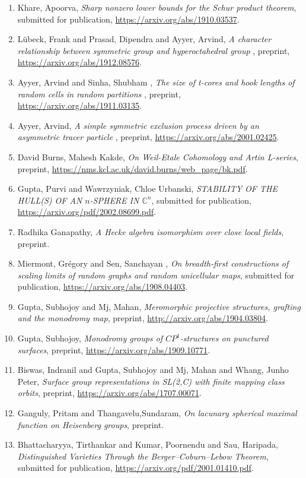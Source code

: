 \begin{enumerate}
\item Khare, Apoorva, \emph{Sharp nonzero lower bounds for the Schur product theorem}, submitted for publication, \url{https://arxiv.org/abs/1910.03537}.
\item Lübeck, Frank and Prasad, Dipendra and Ayyer, Arvind, \emph{A character relationship between symmetric group and hyperoctahedral group }, preprint, \url{https://arxiv.org/abs/1912.08576}.
\item Ayyer, Arvind and Sinha, Shubham , \emph{The size of t-cores and hook lengths of random cells in random partitions }, preprint, \url{https://arxiv.org/abs/1911.03135}.
\item Ayyer, Arvind, \emph{ A simple symmetric exclusion process driven by an asymmetric tracer particle }, preprint, \url{https://arxiv.org/abs/2001.02425}.
\item David Burns, Mahesh Kakde, \emph{On Weil-Etale Cohomology and Artin L-series}, preprint, \url{https://nms.kcl.ac.uk/david.burns/web_page/bk.pdf}.
\item Gupta, Purvi and Wawrzyniak, Chloe Urbanski, \emph{STABILITY OF THE HULL(S) OF AN $n$-SPHERE IN $\mathbb{C}^n$}, submitted for publication, \url{https://arxiv.org/pdf/2002.08699.pdf}.
\item Radhika Ganapathy, \emph{A Hecke algebra isomorphism over close local fields}, preprint.
\item Miermont, Grégory and Sen, Sanchayan , \emph{On breadth-first constructions of scaling limits of random graphs and random unicellular maps}, submitted for publication, \url{https://arxiv.org/abs/1908.04403}.
\item Gupta, Subhojoy and Mj, Mahan, \emph{Meromorphic projective structures, grafting and the monodromy map}, preprint, \url{http://arxiv.org/abs/1904.03804}.
\item Gupta, Subhojoy, \emph{Monodromy groups of $CP^1$-structures on punctured surfaces}, preprint, \url{https://arxiv.org/abs/1909.10771}.
\item Biswas, Indranil and Gupta, Subhojoy and Mj, Mahan and Whang, Junho Peter, \emph{Surface group representations in SL(2,C) with finite mapping class orbits}, preprint, \url{https://arxiv.org/abs/1707.00071}.
\item Ganguly, Pritam and Thangavelu,Sundaram, \emph{On lacunary spherical maximal function on Heisenberg groups}, preprint.
\item Bhattacharyya, Tirthankar and Kumar, Poornendu and Sau, Haripada, \emph{Distinguished Varieties Through the Berger--Coburn--Lebow Theorem}, submitted for publication, \url{https://arxiv.org/pdf/2001.01410.pdf}.

\end{enumerate}
